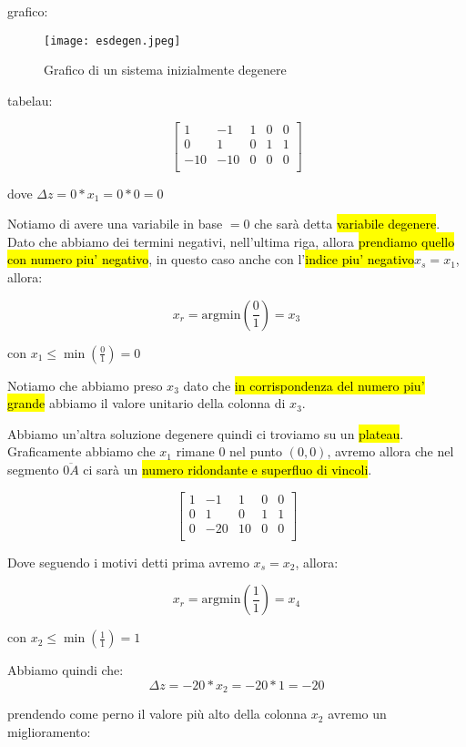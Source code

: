 grafico:


\begin{figure}[H]
\centering
\texttt{[image: esdegen.jpeg]}
\caption{Grafico di un sistema inizialmente degenere} 
\label{esdegen}
\end{figure}

tabelau:

$$
\left[ {\begin{array}{ccccc}
	1 & -1 & 1 & 0 & 0\\
	0 & 1 & 0 & 1 & 1\\
	-10 & -10 & 0 & 0 & 0\\
\end{array} } \right]
$$

dove $\Delta z = 0 * x_1 = 0 * 0 = 0$

Notiamo di avere una variabile in base $= 0$ che sarà detta \hl{variabile degenere}. Dato che abbiamo dei termini negativi, nell'ultima riga, allora \hl{prendiamo quello con numero piu' negativo}, in questo caso anche con l'\hl{indice piu' negativo}$x_s = x_1$, allora:

$$x_r = \text{argmin} (\frac{0}{1}) = x_3$$

con $x_1 \leq \min (\frac{0}{1}) = 0$

Notiamo che abbiamo preso $x_3$ dato che \hl{in corrispondenza del numero piu' grande} abbiamo il valore unitario della colonna di $x_3$. 

Abbiamo un'altra soluzione degenere quindi ci troviamo su un \hl{plateau}. Graficamente abbiamo che $x_1$ rimane 0 nel punto $(0,0)$, avremo allora che nel segmento $\overline{0A}$ ci sarà un \hl{numero ridondante e superfluo di vincoli}. 


$$
\left[ {\begin{array}{ccccc}
	1 & -1 & 1 & 0 & 0\\
	0 & 1 & 0 & 1 & 1\\
	0 & -20 & 10 & 0 & 0\\
\end{array} } \right]
$$


Dove seguendo i motivi detti prima avremo $x_s = x_2$, allora:

$$x_r = \text{argmin}(\frac{1}{1}) = x_4$$

con $x_2 \leq \min(\frac{1}{1}) = 1$

Abbiamo quindi che:
$$\Delta z = -20 * x_2 = -20 * 1 = -20$$

prendendo come perno il valore più alto della colonna $x_2$ avremo un miglioramento:


